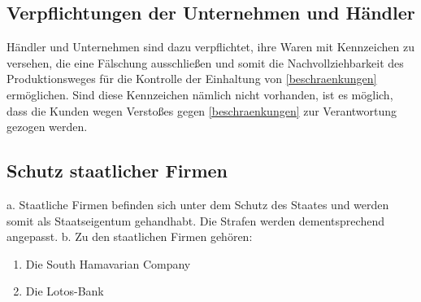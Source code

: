 \documentclass{article}
\begin{document}
\subsection{Verpflichtungen der Unternehmen und Händler}
Händler und Unternehmen sind dazu verpflichtet, ihre Waren mit Kennzeichen zu versehen, die eine Fälschung ausschließen und somit die Nachvollziehbarkeit des Produktionsweges für die Kontrolle der Einhaltung von \ref{beschraenkungen} ermöglichen. Sind diese Kennzeichen nämlich nicht vorhanden, ist es möglich, dass die Kunden wegen Verstoßes gegen \ref{beschraenkungen} zur Verantwortung gezogen werden.

\subsection{Schutz staatlicher Firmen}
a. Staatliche Firmen befinden sich unter dem Schutz des Staates und werden somit als Staatseigentum gehandhabt. Die Strafen werden dementsprechend angepasst.
b. Zu den staatlichen Firmen gehören:
\begin{enumerate}
	\item Die South Hamavarian Company
	\item Die Lotos-Bank
\end{enumerate}
\end{document}
